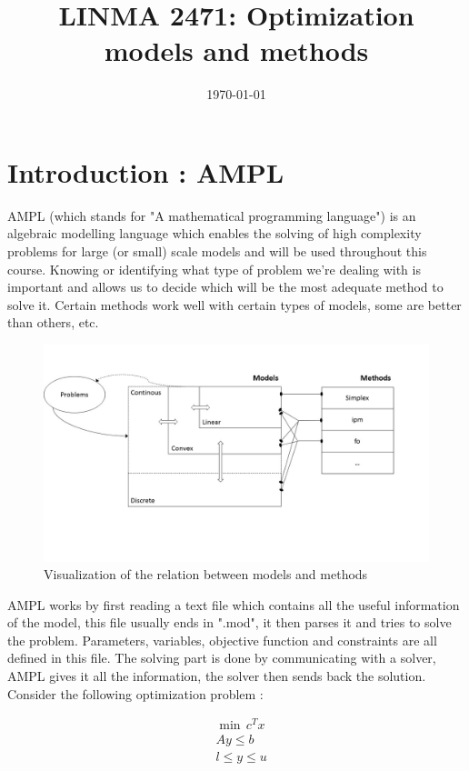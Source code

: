 \documentclass[a4paper,11pt]{article}
\title{LINMA 2471: Optimization \\models and methods\\ }
\date{\today }
\begin{document}
\maketitle

\section{Introduction : AMPL}

AMPL (which stands for "A mathematical programming language") is an algebraic modelling language which enables the solving of high complexity problems for large (or small) scale models and will be used throughout this course. Knowing or identifying what type of problem we're dealing with is important and allows us to decide which will be the most adequate method to solve it. Certain methods work well with certain types of models, some are better than others, etc. \\

\begin{figure}[h!]
\centering
\includegraphics[scale=0.55]{Slide1.JPG}
\caption{Visualization of the relation between models and methods}
\label{Figure1}
\end{figure} 

AMPL works by first reading a text file which contains all the useful information of the model, this file usually ends in ".mod", it then parses it and tries to solve the problem. Parameters, variables, objective function and constraints are all defined in this file. The solving part is done by communicating with a solver, AMPL gives it all the information, the solver then sends back the solution. 
Consider the following optimization problem :

\begin{align*}
          &\min \, c^Tx  \\ 
       	 & Ay\le b\\
	 & l\le y\le u
\end{align*}
\\
\end{document}
